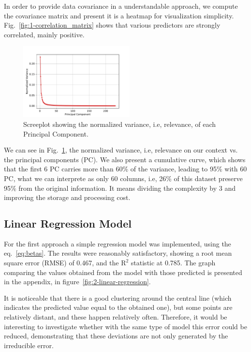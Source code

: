 In order to provide data covariance in a understandable approach, we compute the covariance matrix and present it is a heatmap for visualization simplicity. Fig.~\ref{fig:1-correlation_matrix} shows that various predictors are strongly correlated, mainly positive.

\begin{figure}[htbp!]
  \centerline{\includegraphics[width=0.52\textwidth]{../../code/hw2/figures/0-PCA-screeplot.pdf}}
  \caption{Screeplot showing the normalized variance, i.e, relevance, of each Principal Component.}
  \label{fig:0-PCA-screeplot}
\end{figure}

We can see in Fig.~\ref{fig:0-PCA-screeplot}, the normalized variance, i.e, relevance on our context vs. the principal components (PC). We also present a cumulative curve, which shows that the first 6 PC carries more than 60\% of the variance, leading to 95\% with 60 PC, what we can interprete as only 60 columns, i.e, 26\% of this dataset preserve 95\% from the original information. It means dividing the complexity by 3 and improving the storage and processing cost.

\subsection{Linear Regression Model}
For the first approach a simple regression model was implemented, using the eq.~\ref{eq:betas}. The results were reasonably satisfactory, showing a root mean square error (RMSE) of 0.467, and the $\text{R}^2$ statistic at 0.785. The graph comparing the values obtained from the model with those predicted is presented in the appendix, in figure~\ref{fig:2-linear-regression}. 

It is noticeable that there is a good clustering around the central line (which indicates the predicted value equal to the obtained one), but some points are relatively distant, and these happen relatively often. Therefore, it would be interesting to investigate whether with the same type of model this error could be reduced, demonstrating that these deviations are not only generated by the irreducible error.

